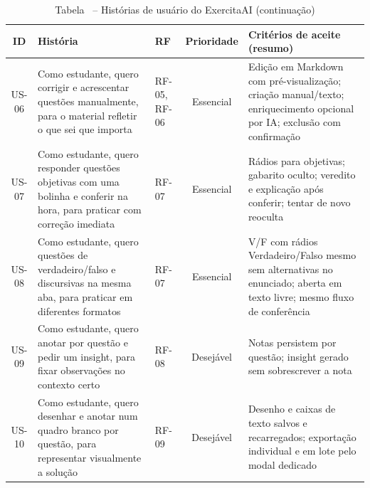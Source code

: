 \begin{table}[H]
\centering
\setlength{\tabcolsep}{2.5pt}
\caption*{Tabela \thetable\ -- Histórias de usuário do ExercitaAI (continuação)}
\begin{tabularx}{\textwidth}{|C|Y|L{1.5cm}|C|Y|}
\hline
\textbf{ID} & \textbf{História} & \textbf{RF} & \textbf{Prioridade} & \textbf{Critérios de aceite (resumo)} \\
\hline
US-06 & Como estudante, quero corrigir e acrescentar questões manualmente, para o material refletir o que sei que importa & RF-05, RF-06 & Essencial & Edição em Markdown com pré-visualização; criação manual/texto; enriquecimento opcional por IA; exclusão com confirmação \\
\hline
US-07 & Como estudante, quero responder questões objetivas com uma bolinha e conferir na hora, para praticar com correção imediata & RF-07 & Essencial & Rádios para objetivas; gabarito oculto; veredito e explicação após conferir; tentar de novo reoculta \\
\hline
US-08 & Como estudante, quero questões de verdadeiro/falso e discursivas na mesma aba, para praticar em diferentes formatos & RF-07 & Essencial & V/F com rádios Verdadeiro/Falso mesmo sem alternativas no enunciado; aberta em texto livre; mesmo fluxo de conferência \\
\hline
US-09 & Como estudante, quero anotar por questão e pedir um insight, para fixar observações no contexto certo & RF-08 & Desejável & Notas persistem por questão; insight gerado sem sobrescrever a nota \\
\hline
US-10 & Como estudante, quero desenhar e anotar num quadro branco por questão, para representar visualmente a solução & RF-09 & Desejável & Desenho e caixas de texto salvos e recarregados; exportação individual e em lote pelo modal dedicado \\
\hline
\end{tabularx}
\end{table}

